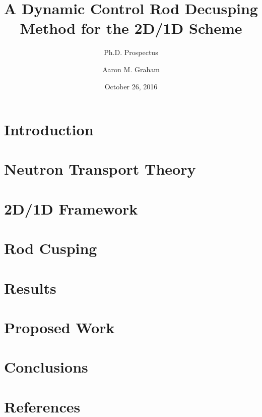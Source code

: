 \documentclass{beamer}
\title[2D/1D Control Rod Decusping]{A Dynamic Control Rod Decusping Method for 
the 2D/1D Scheme}
\subtitle{Ph.D. Prospectus}
\author{Aaron M. Graham}
\date{October 26, 2016}
\begin{document}
\begin{frame}[t]
    \titlepage
\end{frame}

\begin{frame}[t]
    \tableofcontents[hideallsubsections]
\end{frame}

\section{Introduction}


\section{Neutron Transport Theory}


\section{2D/1D Framework}


\section{Rod Cusping}


\section{Results}


\section{Proposed Work}


\section{Conclusions}


\section{References}
\renewcommand{\bibname}{References}


\end{document}

